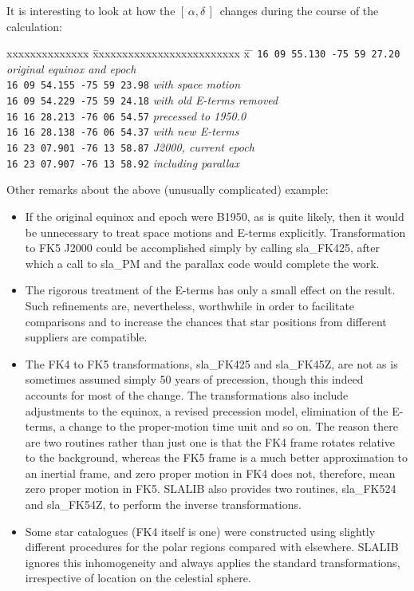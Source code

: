 \documentclass[11pt,twoside]{article}
\newcommand{\radec}     {$[\,\alpha,\delta\,]$}
\begin{document}
\goodbreak
It is interesting to look at how the \radec\ changes during the
course of the calculation:
\begin{tabbing}
xxxxxxxxxxxxxx \= xxxxxxxxxxxxxxxxxxxxxxxxx \= x \= \kill
\> {\tt 16 09 55.130 -75 59 27.20} \> \> {\it original equinox and epoch} \\
\> {\tt 16 09 54.155 -75 59 23.98} \> \> {\it with space motion} \\
\> {\tt 16 09 54.229 -75 59 24.18} \> \> {\it with old E-terms removed} \\
\> {\tt 16 16 28.213 -76 06 54.57} \> \> {\it precessed to 1950.0} \\
\> {\tt 16 16 28.138 -76 06 54.37} \> \> {\it with new E-terms} \\
\> {\tt 16 23 07.901 -76 13 58.87} \> \> {\it J2000, current epoch} \\
\> {\tt 16 23 07.907 -76 13 58.92} \> \> {\it including parallax}
\end{tabbing}

Other remarks about the above (unusually complicated) example:
\begin{itemize}
\item If the original equinox and epoch were B1950, as is quite
      likely, then it would be unnecessary to treat space motions
      and E-terms explicitly.  Transformation to FK5 J2000 could
      be accomplished simply by calling
sla\_FK425, after which
      a call to
sla\_PM and the parallax code would complete the
      work.
\item The rigorous treatment of the E-terms
      has only a small effect on the result.  Such refinements
      are, nevertheless, worthwhile in order to facilitate comparisons and
      to increase the chances that star positions from different
      suppliers are compatible.
\item The FK4 to FK5 transformations,
sla\_FK425
      and
sla\_FK45Z,
      are not as is sometimes assumed simply 50 years of precession,
      though this indeed accounts for most of the change.  The
      transformations also include adjustments
      to the equinox, a revised precession model, elimination of the
      E-terms, a change to the proper-motion time unit and so on.
      The reason there are two routines rather than just one
      is that the FK4 frame rotates relative to the background, whereas
      the FK5 frame is a much better approximation to an
      inertial frame, and zero proper
      motion in FK4 does not, therefore, mean zero proper motion in FK5.
      SLALIB also provides two routines,
sla\_FK524
      and
sla\_FK54Z,
      to perform the inverse transformations.
\item Some star catalogues (FK4 itself is one) were constructed using slightly
      different procedures for the polar regions compared with
      elsewhere.  SLALIB ignores this inhomogeneity and always
      applies the standard
      transformations, irrespective of location on the celestial sphere.
\end{itemize}
\end{document}
